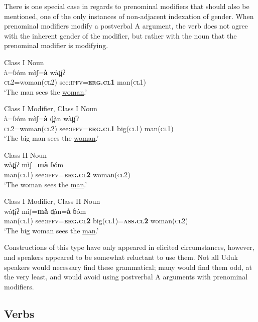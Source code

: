 \documentclass[output=collectionpaper,hidelinks]{langscibook}
\theoremstyle{remark}
\begin{document}
There is one special case in regards to prenominal modifiers that should also be mentioned, one of the only instances of non-adjacent indexation of gender. When
prenominal modifiers modify a postverbal A argument, the verb does not agree
with the inherent gender of the modifier, but rather with the noun that the
prenominal modifier is modifying.

\ea
 Class I Noun \\
\gll à=ɓóm mìʃ=\textbf{à} wàt̪íʔ \\
 \textsc{cl2}=woman(\textsc{cl2}) see:\textsc{ipfv}=\textbf{\textsc{erg.cl1}} man(\textsc{cl1}) \\
\glt `The man sees the \uline{woman}.' \\
\z

\ea
 Class I Modifier, Class I Noun \\
\gll à=ɓóm mìʃ=\textbf{à} d̪àn wàt̪íʔ \\
 \textsc{cl2}=woman(\textsc{cl2}) see:\textsc{ipfv}=\textbf{\textsc{erg.cl1}} big(\textsc{cl1}) man(\textsc{cl1}) \\
\glt `The big man sees the \uline{woman}.' \\
\z

\ea
 Class II Noun \\
\gll wàt̪íʔ mìʃ=\textbf{mà} ɓóm \\
 man(\textsc{cl1}) see:\textsc{ipfv}=\textbf{\textsc{erg.cl2}} woman(\textsc{cl2}) \\
\glt `The woman sees the \uline{man}.' \\
\z

\ea
 Class I Modifier, Class II Noun \\
\gll wàt̪íʔ mìʃ=\textbf{mà} d̪àn=\textbf{à} ɓóm \\
 man(\textsc{cl1}) see:\textsc{ipfv}=\textbf{\textsc{erg.cl2}} big(\textsc{cl1})=\textbf{\textsc{ass.cl2}} woman(\textsc{cl2}) \\
\glt `The big woman sees the \uline{man}.' \\
\z

Constructions of this type have only appeared in elicited circumstances,
however, and speakers appeared to be somewhat reluctant to use them.  Not all
Uduk speakers would necessary find these grammatical; many would find them odd,
at the very least, and would avoid using postverbal A arguments with prenominal
modifiers.

\subsection{Verbs}
\label{sec:Don:Verbs}
\end{document}
